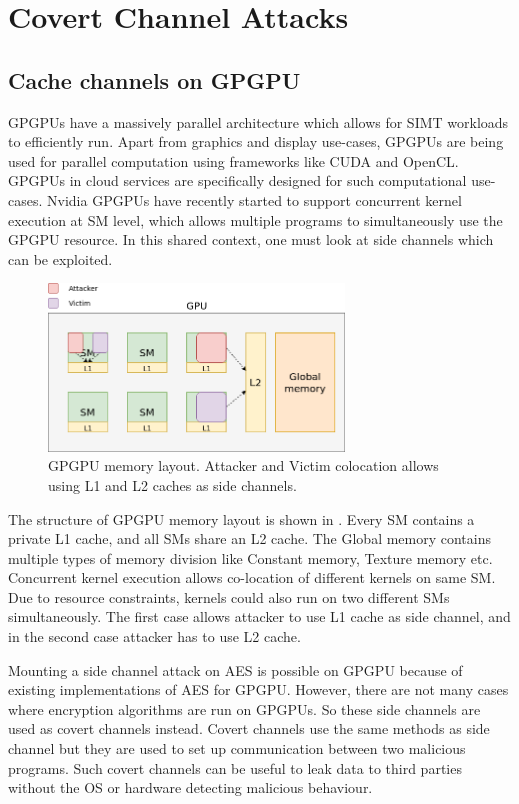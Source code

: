 \chapter{Covert Channel Attacks}

\section{Cache channels on GPGPU}

GPGPUs have a massively parallel architecture which allows for SIMT workloads
to efficiently run. Apart from graphics and display use-cases, GPGPUs are
being used for parallel computation using frameworks like CUDA and OpenCL.
GPGPUs in cloud services are specifically designed for such computational
use-cases. Nvidia GPGPUs have recently started to support concurrent kernel
execution at SM level, which allows multiple programs to simultaneously use
the GPGPU resource. In this shared context, one must look at side channels
which can be exploited.

\begin{figure}[h]
\centering
\includegraphics[width=0.7\textwidth]{figures/gpgpu}
\caption[Memory layout of GPGPU]{GPGPU memory layout.
Attacker and Victim colocation allows using L1 and L2 caches as side channels.}
\label{fig:gpgpu}
\end{figure}

The structure of GPGPU memory layout is shown in . Every SM
contains a private L1 cache, and all SMs share an L2 cache. The Global memory
contains multiple types of memory division like Constant memory, Texture
memory etc. Concurrent kernel execution allows co-location of different
kernels on same SM. Due to resource constraints, kernels could also run on two
different SMs simultaneously. The first case allows attacker to use L1 cache
as side channel, and in the second case attacker has to use L2 cache.

Mounting a side channel attack on AES is possible on GPGPU because of existing
implementations of AES for GPGPU. However, there are not many cases where
encryption algorithms are run on GPGPUs. So these side channels are used as
covert channels instead. Covert channels use the same methods as side channel
but they are used to set up communication between two malicious programs. Such
covert channels can be useful to leak data to third parties without the OS or
hardware detecting malicious behaviour.

